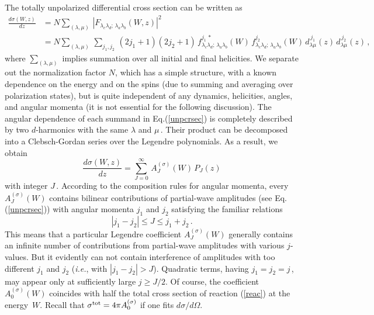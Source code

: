 \documentclass[prc,reprint,onecolumn,amsmath,amssymb,superscriptaddress]{revtex4-1}
\newcommand{\be}{\begin{equation}}
\newcommand{\ee}{\end{equation}}
\begin{document}
The totally unpolarized differential cross section can be written as
\begin{align}
	\frac{d\sigma(W,z)}{d z} &= N\sum_{(\lambda, \mu)}\,
	|F_{\lambda_c\lambda_d;\,\lambda_a\lambda_b}(W,z)|^2 \\
	&= N\sum_{(\lambda, \mu)}\, \sum_{j_1,j_2}\,(2j_1+1)
	(2j_2+1)\,f^{j_1\,*}_{\lambda_c\lambda_d;\,\lambda_a\lambda_b}(W)\,
	f^{j_2}_{\lambda_c\lambda_d;\,\lambda_a\lambda_b}(W)\,
	d^{\,j_1}_{\lambda\mu}(z)\,d^{\,j_2}_{\lambda\mu}(z)\,,
	\label{unpcrsec}
\end{align}
where $\sum_{(\lambda, \mu)}$ implies summation over all initial and final
helicities. We separate out the normalization factor $N$, which has a simple
structure, with a known dependence on the energy and on the
spins (due to summing and averaging over polarization states), but is
quite independent of any dynamics, helicities, angles, and angular momenta
(it is not essential for the following discussion). The angular
dependence of each summand in Eq.(\ref{unpcrsec}) is completely described
by two $d$-harmonics with the same $\lambda$ and $\mu\,$. Their product 
can be decomposed into a Clebsch-Gordan series over the Legendre 
polynomials.  As a result, we obtain
\be
	\frac{d\sigma(W,z)}{d z}=\sum_{J=0}^{\infty}\,A^{(\sigma)}_J(W)\,P_J(z)
	\label{decomp}
\ee
with integer $J\,$. According to the composition rules for angular momenta, 
every $A^{(\sigma)}_J(W)$ contains bilinear contributions of partial-wave 
amplitudes (see Eq.(\ref{unpcrsec})) with angular momenta $j_1$ and $j_2$ 
satisfying the familiar relations
\be
	|j_1-j_2|\leq J \leq j_1+j_2\,.
	\label{3j}
\ee
This means that a particular Legendre coefficient $A^{(\sigma)}_J(W)$ 
generally contains an infinite number of contributions from partial-wave amplitudes 
with various $j$-values. But it evidently can not contain interference of 
amplitudes with too different $j_1$ and $j_2$ ({\it i.e.}, with $|j_1-j_2|>J$). 
Quadratic terms, having $j_1=j_2=j\,$, may appear only at sufficiently large  
$j\geq J/2$. Of course, the coefficient $A^{(\sigma)}_0(W)$ coincides with half 
the total cross section of reaction (\ref{reac}) at the \mbox{energy $W$}. 
Recall that $\sigma^{\rm tot} = 4\pi A^{(\sigma)}_0$ if one fits 
$d\sigma /d\Omega$.
\end{document}

